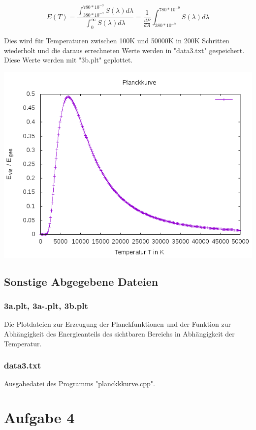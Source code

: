 \documentclass{scrreprt}
\begin{document}
\[
E(T)=\frac{\int_{380*10^{-9}}^{780*10^{-9}}S(\lambda)d\lambda}{\int_{0}^{\infty}S(\lambda)d\lambda} = \frac{1}{\frac{dP}{dA}} \int_{380*10^{-9}}^{780*10^{-9}}S(\lambda)d\lambda
\]

Dies wird für Temperaturen zwischen 100K und 50000K in 200K Schritten wiederholt und die daraus errechneten Werte werden in "data3.txt" gespeichert. Diese Werte werden mit "3b.plt" geplottet.

\begin{center}
	\includegraphics[scale=0.6]{3b.png}
\end{center}

\section*{Sonstige Abgegebene Dateien}
\subsection*{3a.plt, 3a-.plt, 3b.plt}
Die Plotdateien zur Erzeugung der Planckfunktionen und der Funktion zur Abhängigkeit des Energieanteils des sichtbaren Bereichs in Abhängigkeit der Temperatur.
\subsection*{data3.txt}
Ausgabedatei des Programms "planckkkurve.cpp".

\chapter*{Aufgabe 4}
\end{document}
